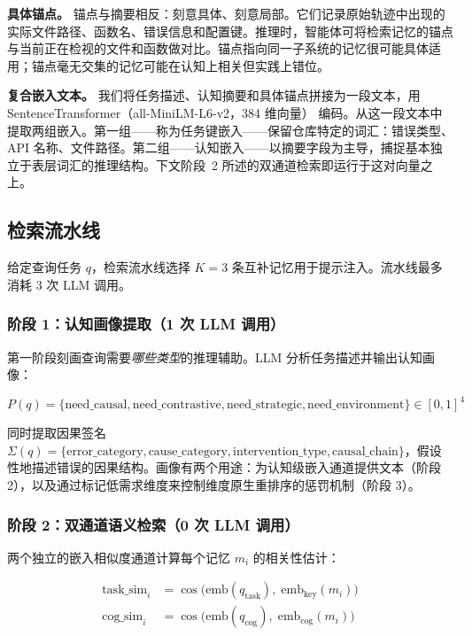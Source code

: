 \documentclass[UTF8,twocolumn]{ctexart}
\begin{document}
\textbf{具体锚点。} 锚点与摘要相反：刻意具体、刻意局部。它们记录原始轨迹中出现的实际文件路径、函数名、错误信息和配置键。推理时，智能体可将检索记忆的锚点与当前正在检视的文件和函数做对比。锚点指向同一子系统的记忆很可能具体适用；锚点毫无交集的记忆可能在认知上相关但实践上错位。

\textbf{复合嵌入文本。} 我们将任务描述、认知摘要和具体锚点拼接为一段文本，用 SentenceTransformer（all-MiniLM-L6-v2，384 维向量）\cite{sentence-transformers} 编码。从这一段文本中提取两组嵌入。第一组——称为任务键嵌入——保留仓库特定的词汇：错误类型、API 名称、文件路径。第二组——认知嵌入——以摘要字段为主导，捕捉基本独立于表层词汇的推理结构。下文阶段~2 所述的双通道检索即运行于这对向量之上。

\subsection{检索流水线}
\label{sec:retrieval-cn}

给定查询任务 $q$，检索流水线选择 $K=3$ 条互补记忆用于提示注入。流水线最多消耗 3 次 LLM 调用。

\subsubsection{阶段 1：认知画像提取（1 次 LLM 调用）}

第一阶段刻画查询需要\emph{哪些类型}的推理辅助。LLM 分析任务描述并输出认知画像：

\begin{equation}
    P(q) = \{\text{need\_causal}, \text{need\_contrastive}, \text{need\_strategic}, \text{need\_environment}\} \in [0,1]^4
\end{equation}

同时提取因果签名 $\Sigma(q) = \{\text{error\_category}, \text{cause\_category}, \text{intervention\_type}, \text{causal\_chain}\}$，假设性地描述错误的因果结构。画像有两个用途：为认知级嵌入通道提供文本（阶段 2），以及通过标记低需求维度来控制维度原生重排序的惩罚机制（阶段 3）。

\subsubsection{阶段 2：双通道语义检索（0 次 LLM 调用）}

两个独立的嵌入相似度通道计算每个记忆 $m_i$ 的相关性估计：

\begin{align}
    \text{task\_sim}_i &= \cos\big(\text{emb}(q_{\text{task}}),\; \text{emb}_{\text{key}}(m_i)\big) \\
    \text{cog\_sim}_i &= \cos\big(\text{emb}(q_{\text{cog}}),\; \text{emb}_{\text{cog}}(m_i)\big)
\end{align}
\end{document}
